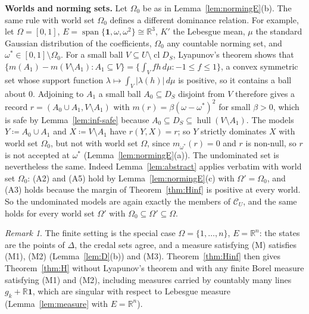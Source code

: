 \documentclass[11pt]{article}
\newcommand{\R}{\mathbb{R}}
\newcommand{\one}{\mathbf{1}}
\newcommand{\CC}{\mathcal{C}}
\newcommand{\hull}{\operatorname{hull}}
\DeclareMathOperator{\cl}{cl}
\theoremstyle{plain}
\theoremstyle{definition}
\theoremstyle{remark}
\newtheorem{remark}[theorem]{Remark}
\begin{document}
\smallskip\noindent\textbf{Worlds and norming sets.} Let $\Omega_0$ be as in
Lemma~\ref{lem:normingE}(b). The same rule with world set $\Omega_0$ defines a different
dominance relation. For example, let $\Omega=[0,1]$, $E=\operatorname{span}\{\one,\omega,
\omega^2\}\cong\R^3$, $K'$ the Lebesgue mean, $\mu$ the standard Gaussian distribution of
the coefficients, $\Omega_0$ any countable norming set, and $\omega^\ast\in[0,1]\setminus
\Omega_0$. For a small ball $V\subseteq U\setminus\cl D_S$, Lyapunov's theorem shows that
$\{m(A_1)-m(V\setminus A_1):A_1\subseteq V\}=\{\int_Vf h\,d\mu:-1\le f\le1\}$, a convex
symmetric set whose support function $\lambda\mapsto\int_V|\lambda(h)|\,d\mu$ is positive,
so it contains a ball about $0$. Adjoining to $A_1$ a small ball $A_0\subseteq D_S$ disjoint
from $V$ therefore gives a record $r=(A_0\cup A_1,V\setminus A_1)$ with $m(r)=\beta(\omega-
\omega^\ast)^2$ for small $\beta>0$, which is safe by Lemma~\ref{lem:inf-safe} because
$A_0\subseteq D_S\subseteq\hull(V\setminus A_1)$. The models $Y\coloneqq A_0\cup A_1$ and
$X\coloneqq V\setminus A_1$ have $r(Y,X)=r$; so $Y$ strictly dominates $X$ with world set
$\Omega_0$, but not with world set $\Omega$, since $m_{\omega^\ast}(r)=0$ and $r$ is
non-null, so $r$ is not accepted at $\omega^\ast$ (Lemma~\ref{lem:normingE}(a)). The
undominated set is nevertheless the same. Indeed Lemma~\ref{lem:abstract}
applies verbatim with world set $\Omega_0$: (A2) and (A5) hold by
Lemma~\ref{lem:normingE}(c) with $\Omega'=\Omega_0$, and (A3) holds because the margin of
Theorem~\ref{thm:Hinf} is positive at every world. So the undominated models are again
exactly the members of $\CC_U$, and the same holds for every world set $\Omega'$ with
$\Omega_0\subseteq\Omega'\subseteq\Omega$.

\begin{remark}\label{rem:finite-special}
The finite setting is the special case $\Omega=\{1,\dots,n\}$, $E=\R^n$: the states are
the points of $\Delta$, the credal sets agree, and a measure satisfying (M) satisfies (M1),
(M2) (Lemma~\ref{lem:D}(b)) and (M3). Theorem~\ref{thm:Hinf} then gives
Theorem~\ref{thm:H} without Lyapunov's theorem and with any finite Borel measure satisfying
(M1) and (M2), including measures carried by countably many lines $g_k+\R\one$, which are
singular with respect to Lebesgue measure (Lemma~\ref{lem:measure} with $E=\R^n$).
\end{remark}
\end{document}

